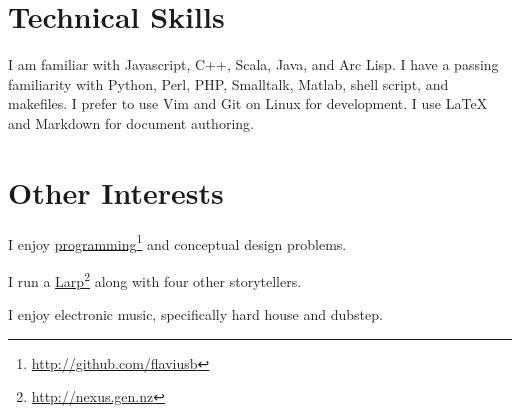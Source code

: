 \documentclass[10pt,oneside]{memoir}
\def\mybibliostyle{plain}
\def\bibliocommand{}
\begin{document}
\chapter{Technical Skills}
\label{technicalskills}

I am familiar with Javascript, C++, Scala, Java, and Arc Lisp. I have a passing familiarity with Python, Perl, PHP, Smalltalk, Matlab, shell script, and makefiles. I prefer to use Vim and Git on Linux for development. I use LaTeX and Markdown for document authoring.


\chapter{Other Interests}
\label{otherinterests}

I enjoy \href{http://github.com/flaviusb}{programming}\footnote{\href{http://github.com/flaviusb}{http://github.com/flaviusb}} and conceptual design problems.


I run a \href{http://nexus.gen.nz}{Larp}\footnote{\href{http://nexus.gen.nz}{http://nexus.gen.nz}} along with four other storytellers.


I enjoy electronic music, specifically hard house and dubstep.


%
%

\backmatter


\bibliocommand

\printglossary


\printindex
\end{document}
